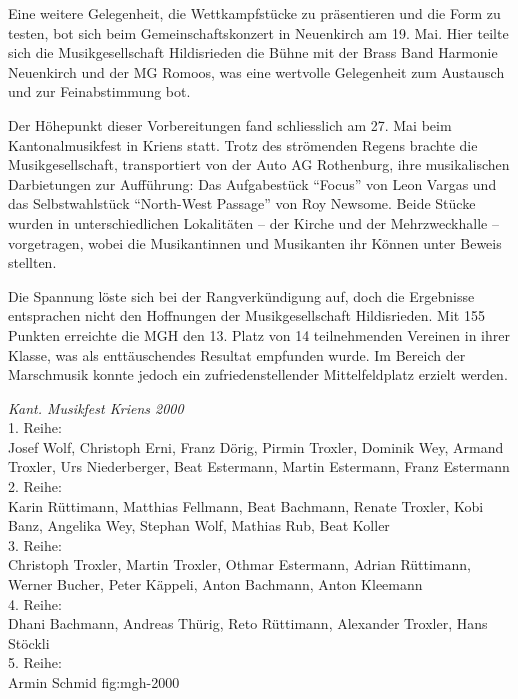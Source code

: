 \begin{history}
    Eine weitere Gelegenheit, die Wettkampfstücke zu präsentieren und die Form
    zu testen, bot sich beim Gemeinschaftskonzert in Neuenkirch am 19. Mai. Hier
    teilte sich die Musikgesellschaft Hildisrieden die Bühne mit der Brass Band
    Harmonie Neuenkirch und der MG Romoos, was eine wertvolle Gelegenheit zum
    Austausch und zur Feinabstimmung bot.

    Der Höhepunkt dieser Vorbereitungen fand schliesslich am 27. Mai beim
    Kantonalmusikfest in Kriens statt. Trotz des strömenden Regens brachte die
    Musikgesellschaft, transportiert von der Auto AG Rothenburg, ihre
    musikalischen Darbietungen zur Aufführung: Das Aufgabestück \enquote{Focus}
    von Leon Vargas und das Selbstwahlstück \enquote{North-West Passage} von Roy
    Newsome. Beide Stücke wurden in unterschiedlichen Lokalitäten -- der Kirche
    und der Mehrzweckhalle -- vorgetragen, wobei die Musikantinnen und
    Musikanten ihr Können unter Beweis stellten.

    Die Spannung löste sich bei der Rangverkündigung auf, doch die Ergebnisse
    entsprachen nicht den Hoffnungen der Musikgesellschaft Hildisrieden. Mit 155
    Punkten erreichte die MGH den 13. Platz von 14 teilnehmenden Vereinen in
    ihrer Klasse, was als enttäuschendes Resultat empfunden wurde. Im Bereich
    der Marschmusik konnte jedoch ein zufriedenstellender Mittelfeldplatz
    erzielt werden.

\end{history}





{\emph{Kant. Musikfest Kriens 2000}\\
    1. Reihe:\\
    Josef Wolf, Christoph Erni, Franz Dörig, Pirmin Troxler, Dominik Wey, Armand
    Troxler, Urs Niederberger, Beat Estermann, Martin Estermann, Franz
    Estermann\\
    2. Reihe:\\
    Karin Rüttimann, Matthias Fellmann, Beat Bachmann, Renate Troxler, Kobi
    Banz, Angelika Wey, Stephan Wolf, Mathias Rub, Beat Koller\\
    3. Reihe:\\
    Christoph Troxler, Martin Troxler, Othmar Estermann, Adrian Rüttimann,
    Werner Bucher, Peter Käppeli, Anton Bachmann, Anton Kleemann\\
    4. Reihe:\\
    Dhani Bachmann, Andreas Thürig, Reto Rüttimann, Alexander Troxler, Hans
    Stöckli\\
    5. Reihe:\\
    Armin Schmid } {fig:mgh-2000}


